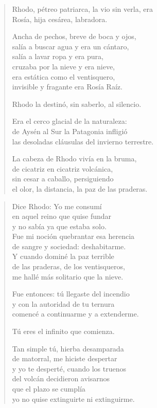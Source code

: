 \documentclass[12pt]{article}
\begin{document}
\clearpage
{}
\begin{verse}

Rhodo, pétreo patriarca, la vio sin verla, era\\
Rosía, hija cesárea, labradora.  

Ancha de pechos, breve de boca y ojos,\\
salía a buscar agua y era un cántaro,\\
salía a lavar ropa y era pura,\\
cruzaba por la nieve y era nieve,\\
era estática como el ventisquero,\\
invisible y fragante era Rosía Raíz.  

Rhodo la destinó, sin saberlo, al silencio.  

Era el cerco glacial de la naturaleza:\\
de Aysén al Sur la Patagonia infligió\\
las desoladas cláusulas del invierno terrestre.  

La cabeza de Rhodo vivía en la bruma,\\
de cicatriz en cicatriz volcánica,\\
sin cesar a caballo, persiguiendo\\
el olor, la distancia, la paz de las praderas.  

\end{verse}

\clearpage
{}
\begin{verse}

Dice Rhodo: Yo me consumí\\
en aquel reino que quise fundar\\
y no sabía ya que estaba solo.\\
Fue mi noción quebrantar esa herencia\\
de sangre y sociedad: deshabitarme.\\
Y cuando dominé la paz terrible\\
de las praderas, de los ventisqueros,\\
me hallé más solitario que la nieve.  

Fue entonces: tú llegaste del incendio\\
y con la autoridad de tu ternura\\
comencé a continuarme y a extenderme.  

Tú eres el infinito que comienza.  

Tan simple tú, hierba desamparada\\
de matorral, me hiciste despertar\\
y yo te desperté, cuando los truenos\\
del volcán decidieron avisarnos\\
que el plazo se cumplía\\
yo no quise extinguirte ni extinguirme.  

\end{verse}
\end{document}
